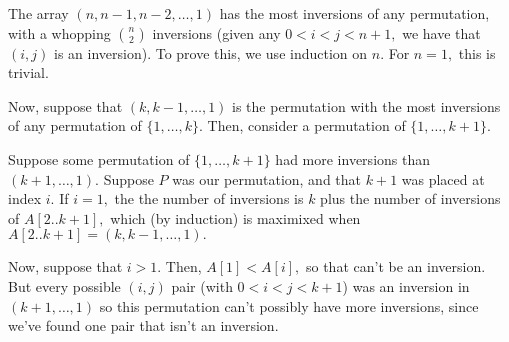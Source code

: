 \documentclass{article}
\begin{document}
The array $(n, n-1, n-2, \dots, 1)$ has the most inversions of any permutation, with a whopping $\binom{n}{2}$ inversions (given any $0 < i < j < n+1,$ we have that $(i, j)$ is an inversion). To prove this, we use induction on $n.$ For $n=1,$ this is trivial.

Now, suppose that $(k, k-1, \dots, 1)$ is the permutation with the most inversions of any permutation of $\{1, \dots, k\}.$ Then, consider a permutation of $\{1, \dots, k+1\}.$ 

Suppose some permutation of $\{1, \dots, k+1\}$ had more inversions than $(k+1, \dots, 1).$ Suppose $P$ was our permutation, and that $k+1$ was placed at index $i.$ If $i=1,$ the the number of inversions is $k$ plus the number of inversions of $A[2..k+1],$ which (by induction) is maximixed when $A[2..k+1] = (k, k-1, \dots, 1).$

Now, suppose that $i > 1.$ Then, $A[1] < A[i],$ so that can't be an inversion. But every possible $(i, j)$ pair (with $0 < i < j < k+1$) was an inversion in $(k+1, \dots, 1)$ so this permutation can't possibly have more inversions, since we've found one pair that isn't an inversion.
\end{document}
